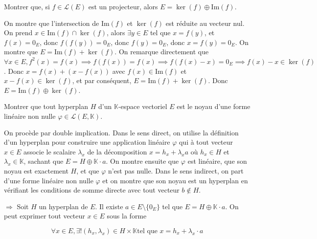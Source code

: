 \documentclass[11pt, a4paper]{article}
\theoremstyle{definition}
\begin{document}
\clearpage

\begin{tcolorbox}[instructionstyle]
	Montrer que, si $f \in \mathcal L(E)$ est un projecteur, alors $E = \ker(f) \oplus \mathrm{Im}(f)$.
\end{tcolorbox}

\begin{outline}
	\1 On montre que l'intersection de $\mathrm{Im}(f)$ et $\ker(f)$ est réduite au vecteur nul.
	\2 On prend $x \in \mathrm{Im}(f) \cap \ker(f)$, alors $\exists y \in E$ tel que $x = f(y)$, et $f(x) = 0_E$, donc $f(f(y)) = 0_E$, donc $f(y) = 0_E$, donc $x = f(y) = 0_E$.
	\1 On montre que $E = \mathrm{Im}(f) + \ker(f)$.
	\2 On remarque directement que $\forall x \in E, f^2(x) = f(x) \implies f(f(x)) = f(x) \implies f(f(x)-x)=0_E \implies f(x)-x \in \ker(f)$. Donc $x = f(x) + (x - f(x))$ avec $f(x) \in \mathrm{Im}(f)$ et $x - f(x) \in \ker(f)$, et par conséquent, $E = \mathrm{Im}(f) + \ker(f)$.
	\1 Donc $E = \mathrm{Im}(f) \oplus \ker(f)$.
\end{outline}

\clearpage

\begin{tcolorbox}[instructionstyle]
	Montrer que tout hyperplan $H$ d'un $\mathbb{K}$-espace vectoriel $E$ est le noyau d'une forme linéaire non nulle $\varphi \in \mathcal{L}(E, \mathbb{K})$.
\end{tcolorbox}

\begin{tcolorbox}[methodstyle]
	On procède par double implication. Dans le sens direct, on utilise la définition d'un hyperplan pour construire une application linéaire $\varphi$ qui à tout vecteur $x \in E$ associe le scalaire $\lambda_x$ de la décomposition $x = h_x + \lambda_x a$ où $h_x \in H$ et $\lambda_x \in \mathbb{K}$, sachant que $E = H \oplus \mathbb{K} \cdot a$. On montre ensuite que $\varphi$ est linéaire, que son noyau est exactement $H$, et que $\varphi$ n'est pas nulle. Dans le sens indirect, on part d'une forme linéaire non nulle $\varphi$ et on montre que son noyau est un hyperplan en vérifiant les conditions de somme directe avec tout vecteur $b \notin H$.
\end{tcolorbox}

$\Longrightarrow$ Soit $H$ un hyperplan de $E$.
Il existe $a \in E \setminus \{0_E\}$ tel que $E = H \oplus \mathbb{K} \cdot a$. On peut exprimer tout vecteur $x \in E$ sous la forme 

$$\forall x \in E, \exists! (h_x, \lambda_x) \in H \times \mathbb{K} \text{tel que } x = h_x + \lambda_x \cdot a$$
\end{document}
